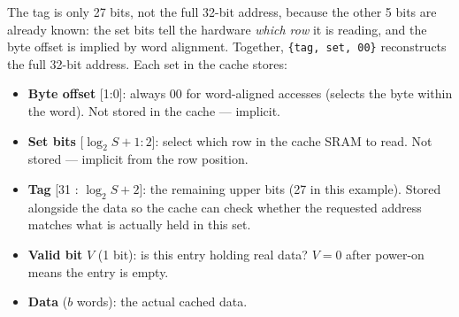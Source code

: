 \documentclass[9pt, a4paper]{extarticle}
\begin{document}
\begin{center}
\end{center}

The tag is only 27 bits, not the full 32-bit address, because the other 5 bits are already known: the set bits tell the hardware \emph{which row} it is reading, and the byte offset is implied by word alignment. Together, \texttt{\{tag, set, 00\}} reconstructs the full 32-bit address. Each set in the cache stores:

\begin{itemize}
    \item \textbf{Byte offset} [1:0]: always 00 for word-aligned accesses (selects the byte within the word). Not stored in the cache --- implicit.
    \item \textbf{Set bits} [$\log_2 S + 1 : 2$]: select which row in the cache SRAM to read. Not stored --- implicit from the row position.
    \item \textbf{Tag} [31 : $\log_2 S + 2$]: the remaining upper bits (27 in this example). Stored alongside the data so the cache can check whether the requested address matches what is actually held in this set.
    \item \textbf{Valid bit} $V$ (1 bit): is this entry holding real data? $V = 0$ after power-on means the entry is empty.
    \item \textbf{Data} ($b$ words): the actual cached data.
\end{itemize}
\end{document}
